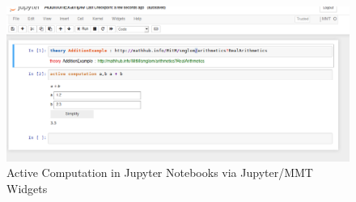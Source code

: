 \begin{figure}[ht]\centering
  \includegraphics[width=15cm]{screenshots/activecomp}
  \caption{Active Computation in Jupyter Notebooks via Jupyter/MMT Widgets}\label{fig:ac}
\end{figure}


